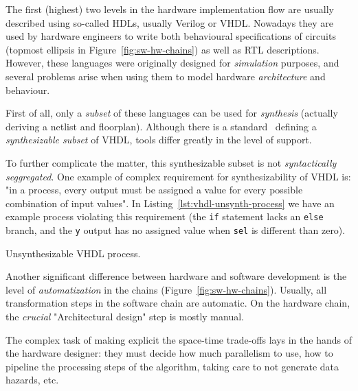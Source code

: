         The first (highest) two levels in the hardware implementation flow are usually described using
        so-called \acp{HDL}, usually Verilog or \acs{VHDL}.
        Nowadays they are used by hardware engineers to write both behavioural specifications of circuits
        (topmost ellipsis in Figure~\ref{fig:sw-hw-chains}) as well as \ac{RTL} descriptions.
        However, these languages were originally designed for \emph{simulation} purposes,
        and several problems arise when using them to model hardware \emph{architecture} and behaviour.

        First of all, only a \emph{subset} of these languages can be used for \emph{synthesis}
        (actually deriving a netlist and floorplan).
        Although there is a standard~\cite{ieee1076-3-synth-vhdl} defining a \emph{synthesizable subset} of \acs{VHDL},
        tools differ greatly in the level of support.

        To further complicate the matter, this synthesizable subset is not \emph{syntactically seggregated}.
        One example of complex requirement for synthesizability of \acs{VHDL} is:
        "in a process, every output must be assigned a value for every possible combination of input values".
        In Listing~\ref{lst:vhdl-unsynth-process} we have an example process violating this requirement
        (the \texttt{if} statement lacks an \texttt{else} branch, and the \texttt{y} output has no assigned
        value when \texttt{sel} is different than zero).

        \begin{listing}[h]
            \caption{Unsynthesizable \acs{VHDL} process.\label{lst:vhdl-unsynth-process}}
        \end{listing}

        Another significant difference between hardware and software development
        is the level of \emph{automatization} in the chains (Figure~\ref{fig:sw-hw-chains}).
        Usually, all transformation steps in the software chain are automatic.
        On the hardware chain, the \emph{crucial} "Architectural design" step is mostly manual.

        The complex task of making explicit the space-time trade-offs lays in the hands of the hardware designer:
        they must decide how much parallelism to use, how to pipeline the processing steps of the algorithm,
        taking care to not generate data hazards, etc.

